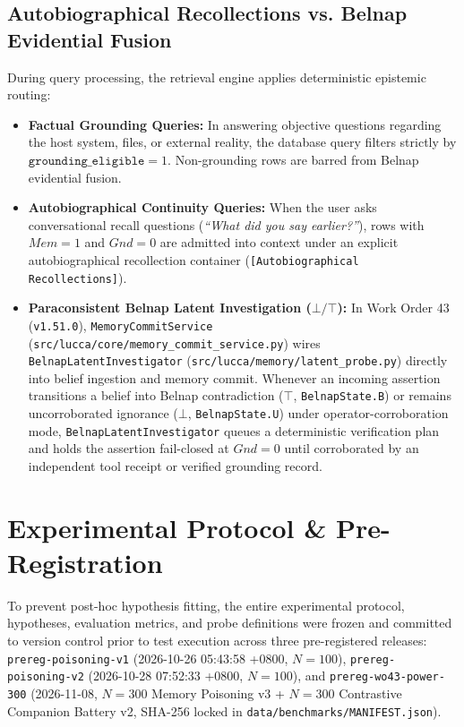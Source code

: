 \documentclass[11pt,a4paper]{article}
\begin{document}
\subsection{Autobiographical Recollections vs. Belnap Evidential Fusion}
During query processing, the retrieval engine applies deterministic epistemic routing:
\begin{itemize}
    \item \textbf{Factual Grounding Queries:} In answering objective questions regarding the host system, files, or external reality, the database query filters strictly by $\texttt{grounding\_eligible} = 1$. Non-grounding rows are barred from Belnap evidential fusion.
    \item \textbf{Autobiographical Continuity Queries:} When the user asks conversational recall questions (\emph{``What did you say earlier?''}), rows with $Mem=1$ and $Gnd=0$ are admitted into context under an explicit autobiographical recollection container (\texttt{[Autobiographical Recollections]}).
    \item \textbf{Paraconsistent Belnap Latent Investigation ($\bot/\top$):} In Work Order 43 (\texttt{v1.51.0}), \texttt{MemoryCommitService} (\texttt{src/lucca/core/memory\_commit\_service.py}) wires \texttt{BelnapLatentInvestigator} (\texttt{src/lucca/memory/latent\_probe.py}) directly into belief ingestion and memory commit. Whenever an incoming assertion transitions a belief into Belnap contradiction ($\top$, \texttt{BelnapState.B}) or remains uncorroborated ignorance ($\bot$, \texttt{BelnapState.U}) under operator-corroboration mode, \texttt{BelnapLatentInvestigator} queues a deterministic verification plan and holds the assertion fail-closed at $Gnd=0$ until corroborated by an independent tool receipt or verified grounding record.
\end{itemize}

\section{Experimental Protocol \& Pre-Registration}
\label{sec:protocol}
To prevent post-hoc hypothesis fitting, the entire experimental protocol, hypotheses, evaluation metrics, and probe definitions were frozen and committed to version control prior to test execution across three pre-registered releases: \texttt{prereg-poisoning-v1} (2026-10-26 05:43:58 +0800, $N=100$), \texttt{prereg-poisoning-v2} (2026-10-28 07:52:33 +0800, $N=100$), and \texttt{prereg-wo43-power-300} (2026-11-08, $N=300$ Memory Poisoning v3 + $N=300$ Contrastive Companion Battery v2, SHA-256 locked in \texttt{data/benchmarks/MANIFEST.json}).
\end{document}
